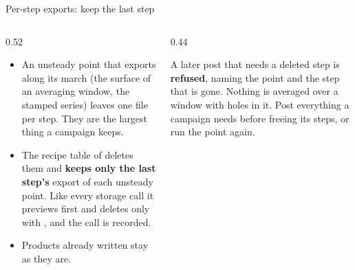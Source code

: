 \begin{frame}{Per-step exports: keep the last step}
\begin{columns}[T]
\begin{column}{0.52\textwidth}
\begin{itemize}\small
  \item An unsteady point that exports along its march (the surface of an
        averaging window, the stamped series) leaves one file per step. They
        are the largest thing a campaign keeps.
  \item The recipe table  of
         deletes them and \textbf{keeps only
        the last step's} export of each unsteady point. Like every storage call it
        previews first and deletes only with , and the call is
        recorded.
  \item Products already written stay as they are.
\end{itemize}
\end{column}
\begin{column}{0.44\textwidth}
\begin{alertblock}{A later post that needs a deleted step}
\small is \textbf{refused}, naming the point and the step that is gone.
Nothing is averaged over a window with holes in it. Post everything a
campaign needs before freeing its steps, or run the point again.
\end{alertblock}
\end{column}
\end{columns}
\end{frame}
